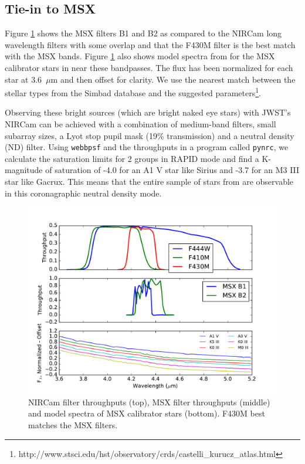 \documentclass{aastex6}
\begin{document}
\subsection{Tie-in to MSX}

Figure \ref{fig:msxNCfilterOverlap} shows the MSX filters B1 and B2 as compared to the NIRCam long wavelength filters with some overlap and that the F430M filter is the best match with the MSX bands.
Figure \ref{fig:msxNCfilterOverlap} also shows model spectra from \citet{castelli2004models} for the MSX calibrator stars in \citet{price2004msxCal} near these bandpasses.
The flux has been normalized for each star at 3.6~$\mu$m and then offset for clarity.
We use the nearest match between the stellar types from the Simbad database and the suggested \citet{castelli2004models} parameters\footnote{http://www.stsci.edu/hst/observatory/crds/castelli\_kurucz\_atlas.html}.

Observing these bright sources (which are bright naked eye stars) with JWST's NIRCam can be achieved with a combination of medium-band filters, small subarray sizes, a Lyot stop pupil mask (19\% transmission) and a neutral density (ND) filter.
Using \texttt{webbpsf} and the throughputs in a program called \texttt{pynrc}, we calculate the saturation limits for 2 groups in RAPID mode and find a K-magnitude of saturation of -4.0 for an A1 V star like Sirius and -3.7 for an M3 III star like Gacrux.
This means that the entire sample of stars from \citet{price2004msxCal} are observable in this coronagraphic neutral density mode.

\begin{figure}[!hbtp]
\centering
\includegraphics[width=.55\columnwidth]{msx_nircam_filt.pdf}
\caption{NIRCam filter throughputs (top), MSX filter throughputs \citep{egan1999msxGuide} (middle) and model spectra of MSX calibrator stars (bottom). F430M best matches the MSX filters.}\label{fig:msxNCfilterOverlap}
\end{figure}
\end{document}

